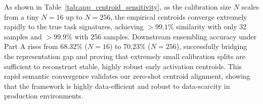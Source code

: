 \documentclass{article}
\theoremstyle{plain}
\theoremstyle{definition}
\theoremstyle{remark}
\begin{document}
\begin{table}[H]
\caption{\textbf{Sensitivity Analysis of Zero-Shot Centroid Stability and Joint Routing Accuracy under Varying Calibration Split Sizes ($N$).} Cosine similarities and downstream Joint Mean accuracies are reported across 10 independent random seeds. The true ceiling from Part B represents the idealized, un-gated ensembling ceiling where centroids perfectly match the task signatures.}
\label{tab:app_centroid_sensitivity}
\vskip 0.1in
\begin{center}
\begin{small}
\begin{sc}
\end{sc}
\end{small}
\end{center}
\vskip -0.1in
\end{table}

As shown in Table~\ref{tab:app_centroid_sensitivity}, as the calibration size $N$ scales from a tiny $N=16$ up to $N=256$, the empirical centroids converge extremely rapidly to the true task signatures, achieving $>99.1\%$ similarity with only 32 samples and $>99.9\%$ with 256 samples. Downstream ensembling accuracy under Part A rises from $68.32\%$ ($N=16$) to $70.23\%$ ($N=256$), successfully bridging the representation gap and proving that extremely small calibration splits are sufficient to reconstruct stable, highly robust early activation centroids. This rapid semantic convergence validates our zero-shot centroid alignment, showing that the framework is highly data-efficient and robust to data-scarcity in production environments.
\end{document}
